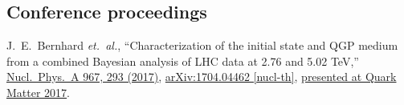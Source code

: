 \documentclass[letterpaper,10pt]{article}
\begin{document}
\begin{multicols}{2}
\subsection{Conference proceedings}

J.~E.~Bernhard \textit{et.\ al.},
``Characterization of the initial state and QGP medium from a combined Bayesian analysis of LHC data at 2.76 and 5.02 TeV,''
\href{https://www.sciencedirect.com/science/article/pii/S0375947417301549}{Nucl.\ Phys.\ A 967, 293 (2017)},
\href{https://arxiv.org/abs/1704.04462}{arXiv:1704.04462 [nucl-th]},
\href{https://indico.cern.ch/event/433345/contributions/2358284}{presented at Quark Matter 2017}.

\end{multicols}
\end{document}
